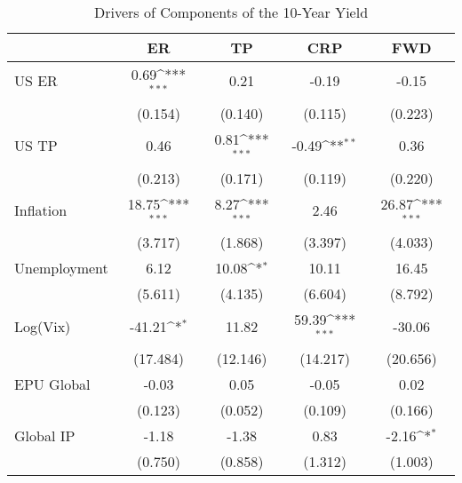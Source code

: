 \begin{table}[htbp]\centering
\def\sym#1{\ifmmode^{#1}\else\(^{#1}\)\fi}
\caption{Drivers of Components of the 10-Year Yield}
\begin{tabular*}{0.8\hsize}{@{\hskip\tabcolsep\extracolsep\fill}l*{4}{c}}
\toprule
                    &\multicolumn{1}{c}{ER}&\multicolumn{1}{c}{TP}&\multicolumn{1}{c}{CRP}&\multicolumn{1}{c}{FWD}\\
\midrule
US ER               &        0.69\sym{***}&        0.21         &       -0.19         &       -0.15         \\
                    &     (0.154)         &     (0.140)         &     (0.115)         &     (0.223)         \\
\addlinespace
US TP               &        0.46         &        0.81\sym{***}&       -0.49\sym{**} &        0.36         \\
                    &     (0.213)         &     (0.171)         &     (0.119)         &     (0.220)         \\
\addlinespace
Inflation           &       18.75\sym{***}&        8.27\sym{***}&        2.46         &       26.87\sym{***}\\
                    &     (3.717)         &     (1.868)         &     (3.397)         &     (4.033)         \\
\addlinespace
Unemployment        &        6.12         &       10.08\sym{*}  &       10.11         &       16.45         \\
                    &     (5.611)         &     (4.135)         &     (6.604)         &     (8.792)         \\
\addlinespace
Log(Vix)            &      -41.21\sym{*}  &       11.82         &       59.39\sym{***}&      -30.06         \\
                    &    (17.484)         &    (12.146)         &    (14.217)         &    (20.656)         \\
\addlinespace
EPU Global          &       -0.03         &        0.05         &       -0.05         &        0.02         \\
                    &     (0.123)         &     (0.052)         &     (0.109)         &     (0.166)         \\
\addlinespace
Global IP           &       -1.18         &       -1.38         &        0.83         &       -2.16\sym{*}  \\
                    &     (0.750)         &     (0.858)         &     (1.312)         &     (1.003)         \\

\end{tabular*}
\end{table}
